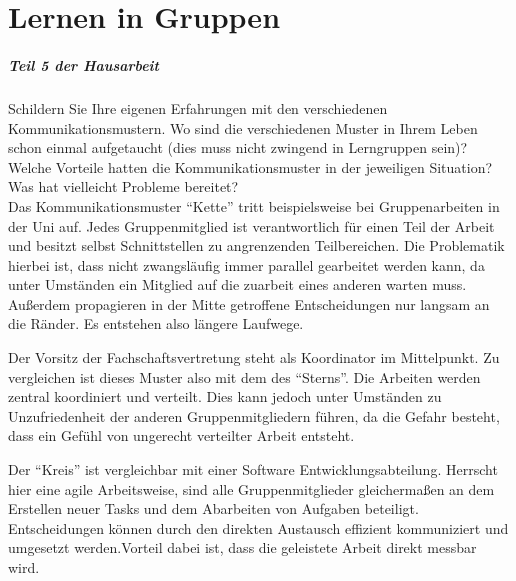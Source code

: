%
\chapter{Lernen in Gruppen}
\label{sec:lernen-in-gruppen}

\paragraph{Teil 5 der Hausarbeit}
Schildern Sie Ihre eigenen Erfahrungen mit den verschiedenen Kommunikationsmustern. Wo sind die verschiedenen Muster in Ihrem Leben schon einmal aufgetaucht (dies muss nicht zwingend in Lerngruppen sein)? Welche Vorteile hatten die Kommunikationsmuster in der jeweiligen Situation? Was hat vielleicht Probleme bereitet? \\[0.4em]

Das Kommunikationsmuster “Kette” tritt beispielsweise bei Gruppenarbeiten in der Uni auf. Jedes Gruppenmitglied ist verantwortlich für einen Teil der Arbeit und besitzt selbst Schnittstellen zu angrenzenden Teilbereichen. Die Problematik hierbei ist, dass nicht zwangsläufig immer parallel gearbeitet werden kann, da unter Umständen ein Mitglied auf die zuarbeit eines anderen warten muss. Außerdem propagieren in der Mitte getroffene Entscheidungen nur langsam an die Ränder. Es entstehen also längere Laufwege.

Der Vorsitz der Fachschaftsvertretung steht  als Koordinator im Mittelpunkt. Zu vergleichen ist dieses Muster also mit dem des “Sterns”. Die Arbeiten werden zentral koordiniert und verteilt. Dies kann jedoch unter Umständen zu Unzufriedenheit der anderen Gruppenmitgliedern führen, da die Gefahr besteht, dass ein Gefühl von ungerecht verteilter Arbeit entsteht.

Der “Kreis” ist vergleichbar mit einer Software Entwicklungsabteilung. Herrscht hier eine agile Arbeitsweise, sind alle Gruppenmitglieder gleichermaßen an dem Erstellen neuer Tasks und dem Abarbeiten von Aufgaben beteiligt. Entscheidungen können durch den direkten Austausch effizient kommuniziert und umgesetzt werden.Vorteil dabei ist, dass die geleistete Arbeit direkt messbar wird.
